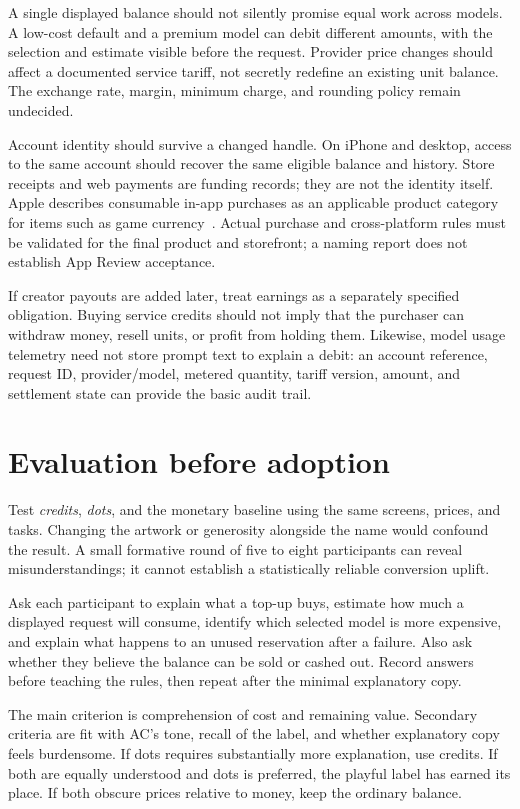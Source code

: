 \documentclass[10pt,letterpaper,twocolumn]{article}
\begin{document}
A single displayed balance should not silently promise equal work across models. A low-cost default and a premium model can debit different amounts, with the selection and estimate visible before the request. Provider price changes should affect a documented service tariff, not secretly redefine an existing unit balance. The exchange rate, margin, minimum charge, and rounding policy remain undecided.

Account identity should survive a changed handle. On iPhone and desktop, access to the same account should recover the same eligible balance and history. Store receipts and web payments are funding records; they are not the identity itself. Apple describes consumable in-app purchases as an applicable product category for items such as game currency~\cite{apple}. Actual purchase and cross-platform rules must be validated for the final product and storefront; a naming report does not establish App Review acceptance.

If creator payouts are added later, treat earnings as a separately specified obligation. Buying service credits should not imply that the purchaser can withdraw money, resell units, or profit from holding them. Likewise, model usage telemetry need not store prompt text to explain a debit: an account reference, request ID, provider/model, metered quantity, tariff version, amount, and settlement state can provide the basic audit trail.

\section{Evaluation before adoption}
Test \emph{credits}, \emph{dots}, and the monetary baseline using the same screens, prices, and tasks. Changing the artwork or generosity alongside the name would confound the result. A small formative round of five to eight participants can reveal misunderstandings; it cannot establish a statistically reliable conversion uplift.

Ask each participant to explain what a top-up buys, estimate how much a displayed request will consume, identify which selected model is more expensive, and explain what happens to an unused reservation after a failure. Also ask whether they believe the balance can be sold or cashed out. Record answers before teaching the rules, then repeat after the minimal explanatory copy.

The main criterion is comprehension of cost and remaining value. Secondary criteria are fit with AC's tone, recall of the label, and whether explanatory copy feels burdensome. If dots requires substantially more explanation, use credits. If both are equally understood and dots is preferred, the playful label has earned its place. If both obscure prices relative to money, keep the ordinary balance.
\end{document}
